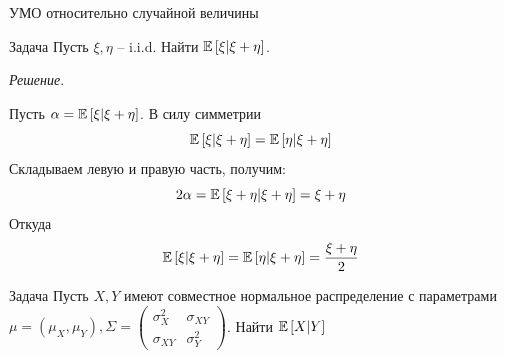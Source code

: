 \documentclass{beamer}
\begin{document}
\begin{frame}{УМО относительно случайной величины}


    \begin{block}{Задача}
        Пусть $\xi, \eta$ -- i.i.d. Найти $\mathbb{E} \left[ \xi | \xi + \eta\right]$.
    \end{block}
    \textit{Решение}. 
    
    Пусть $\alpha = \mathbb{E} \left[ \xi | \xi + \eta\right]$. В силу симметрии $$\mathbb{E} \left[ \xi | \xi + \eta\right] = \mathbb{E} \left[ \eta | \xi + \eta\right]$$
    Складываем левую и правую часть, получим: $$2\alpha =\mathbb{E} \left[ \xi + \eta | \xi + \eta\right] = \xi + \eta$$
    Откуда
    $$
        \mathbb{E} \left[ \xi | \xi + \eta\right] = \mathbb{E} \left[ \eta | \xi + \eta\right] = \dfrac{\xi+\eta}{2}
    $$

    \begin{block}{Задача}
        Пусть $X, Y$ имеют совместное нормальное распределение с параметрами $\mu = (\mu_X, \mu_Y), \Sigma = \begin{pmatrix}
            \sigma_X^2 & \sigma_{XY} \\
            \sigma_{XY} & \sigma_Y^2
        \end{pmatrix}$. Найти $\mathbb{E} \left[ X | Y\right]$
    \end{block}
\end{frame}



\end{document}
